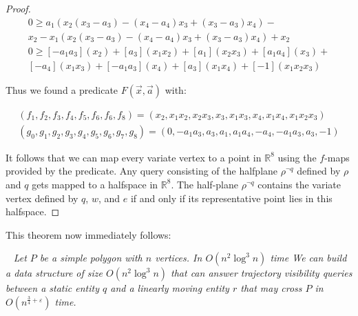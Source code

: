 \documentclass[UKenglish]{lipics-v2019}
\newcommand{\eps}{\ensuremath{\varepsilon}\xspace}
\newcommand{\thmheadfont}{\textcolor{darkgray}{$\blacktriangleright$}\nobreakspace\sffamily\bfseries}
\newenvironment{repeatenv}[2]%
  {\smallskip\noindent {\thmheadfont #1~\ref{#2}.}\ \slshape}
  {\normalfont}
\newenvironment{repeattheorem}    [1]{\begin{repeatenv}{Theorem}{#1}}    {\end{repeatenv}}
\begin{document}
\begin{proof}
\begin{align*}
    0 \ge a_1 (x_2 (x_3 - a_3) - (x_4 - a_4)x_3 + (x_3 - a_3) x_4) - \\
    x_2 - x_1 (x_2 (x_3 - a_3) - (x_4 - a_4)x_3 + (x_3 - a_3) x_4) + x_2 \\
    0 \ge [-a_1 a_3] (x_2) + [a_3]( x_1 x_2) + [a_1] (x_2 x_3) + [a_1a_4] (x_3) + \\
    [- a_4] (x_1 x_3) + [- a_1 a_3]( x_4) + [a_3] (x_1 x_4) + [-1](x_1 x_2 x_3)
\end{align*}

Thus we found a predicate $F(\vec{x}, \vec{a})$ with:

\begin{align*}
    (f_1, f_2, f_3, f_4, f_5, f_6, f_6, f_8) = (x_2, x_1x_2, x_2x_3, x_3, x_1x_3, x_4, x_1x_4, x_1x_2x_3) \\
    (g_0, g_1, g_2, g_3, g_4, g_5,g_6, g_7,g_8) = (0, -a_1a_3, a_3, a_1, a_1a_4, -a_4, -a_1a_3, a_3, -1)
\end{align*}

It follows that we can map every variate vertex to a point in $\mathbb{R}^8$
using the $f$-maps provided by the predicate. Any query consisting of the
halfplane $\rho^{\neg q}$ defined by $\rho$ and $q$ gets mapped to a halfspace
in $\mathbb{R}^8$. The half-plane $\rho^{\neg q}$ contains the variate vertex
defined by $q$, $w$, and $e$ if and only if its representative point lies in
this halfspace.
\end{proof}


This theorem now immediately follows:

\begin{repeattheorem}{thm:one_dead_one_ghost}
  Let $P$ be a simple polygon with $n$ vertices. In $O(n^2\log^3 n)$ time We
  can build a data structure of size $O(n^2\log^3 n)$ that can answer
  trajectory visibility queries between a static entity $q$ and a linearly
  moving entity $r$ that may cross $P$ in $O(n^{\frac{3}{4}+\eps})$ time.
\end{repeattheorem}


\end{document}
